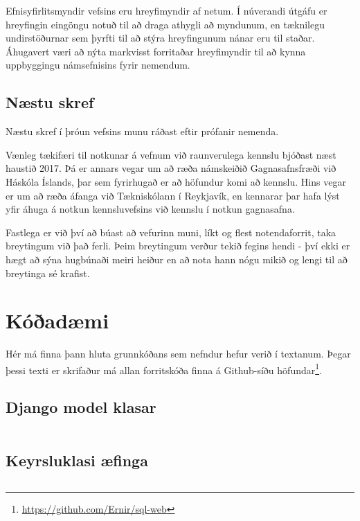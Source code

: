 \documentclass[a4paper,12pt,twoside,BCOR=10mm]{scrbook}
\begin{document}
Efnisyfirlitsmyndir vefsins eru hreyfimyndir af netum. Í núverandi útgáfu er hreyfingin eingöngu notuð til að draga athygli að myndunum, en tæknilegu undirstöðurnar sem þyrfti til að stýra hreyfingunum nánar eru til staðar. Áhugavert væri að nýta markvisst forritaðar hreyfimyndir til að kynna uppbyggingu námsefnisins fyrir nemendum.
\section{Næstu skref}
Næstu skref í þróun vefsins munu ráðast eftir prófanir nemenda. 

Vænleg tækifæri til notkunar á vefnum við raunverulega kennslu bjóðast næst haustið 2017. Þá er annars vegar um að ræða námskeiðið Gagnasafnsfræði við Háskóla Íslands, þar sem fyrirhugað er að höfundur komi að kennslu. Hins vegar er um að ræða áfanga við Tækniskólann í Reykjavík, en kennarar þar hafa lýst yfir áhuga á notkun kennsluvefsins við kennslu í notkun gagnasafna.

Fastlega er við því að búast að vefurinn muni, líkt og flest notendaforrit, taka breytingum við það ferli. Þeim breytingum verður tekið fegins hendi - því ekki er hægt að sýna hugbúnaði meiri heiður en að nota hann nógu mikið og lengi til að breytinga sé krafist.




\appendix
\renewcommand{\chaptername}{Appendix}

\chapter{Kóðadæmi}
\label{sec:code-excerpts}
Hér má finna þann hluta grunnkóðans sem nefndur hefur verið í textanum. Þegar þessi texti er skrifaður má allan forritskóða finna á Github-síðu höfundar\footnote{\url{https://github.com/Ernir/sql-web}}.
\section{Django model klasar}
\label{code:django-model-objects}
\inputminted[fontsize=\scriptsize, frame=lines, linenos=true, python3=true, label=models.py]{python}{../sql\string_web/models.py}
\section{Keyrsluklasi æfinga}
\label{code:example-runner}
\inputminted[fontsize=\scriptsize, frame=lines, linenos=true, python3=true, label=sql_runner.py]{python}{../sql\string_web/sql\string_runner.py}
\end{document}
